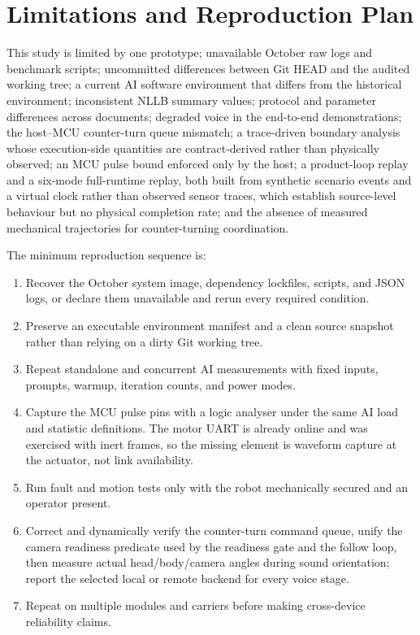 \documentclass[conference]{IEEEtran}
\begin{document}
\section{Limitations and Reproduction Plan}
This study is limited by one prototype; unavailable October raw logs and benchmark scripts; uncommitted differences between Git HEAD and the audited working tree; a current AI software environment that differs from the historical environment; inconsistent NLLB summary values; protocol and parameter differences across documents; degraded voice in the end-to-end demonstrations; the host--MCU counter-turn queue mismatch; a trace-driven boundary analysis whose execution-side quantities are contract-derived rather than physically observed; an MCU pulse bound enforced only by the host; a product-loop replay and a six-mode full-runtime replay, both built from synthetic scenario events and a virtual clock rather than observed sensor traces, which establish source-level behaviour but no physical completion rate; and the absence of measured mechanical trajectories for counter-turning coordination.

The minimum reproduction sequence is:
\begin{enumerate}
\item Recover the October system image, dependency lockfiles, scripts, and JSON logs, or declare them unavailable and rerun every required condition.
\item Preserve an executable environment manifest and a clean source snapshot rather than relying on a dirty Git working tree.
\item Repeat standalone and concurrent AI measurements with fixed inputs, prompts, warmup, iteration counts, and power modes.
\item Capture the MCU pulse pins with a logic analyser under the same AI load and statistic definitions. The motor UART is already online and was exercised with inert frames, so the missing element is waveform capture at the actuator, not link availability.
\item Run fault and motion tests only with the robot mechanically secured and an operator present.
\item Correct and dynamically verify the counter-turn command queue, unify the camera readiness predicate used by the readiness gate and the follow loop, then measure actual head/body/camera angles during sound orientation; report the selected local or remote backend for every voice stage.
\item Repeat on multiple modules and carriers before making cross-device reliability claims.
\end{enumerate}
\end{document}

